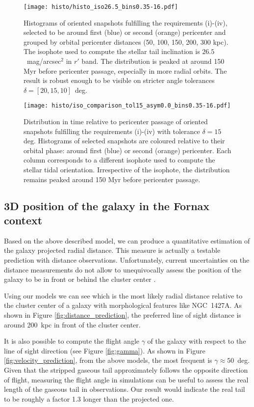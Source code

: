\begin{figure*}
\centering
\texttt{[image: histo/histo\_iso26.5\_bins0.35-16.pdf]}
\caption{Histograms of oriented snapshots fulfilling the requirements (i)-(iv), selected to be around first (blue) or second (orange) pericenter and grouped by orbital pericenter distances (50, 100, 150, 200, 300 kpc).
The isophote used to compute the stellar tail inclination is $26.5$~mag/arcsec$^2$ in $r'$ band.
The distribution is peaked at around 150 Myr before pericenter passage, especially in more radial orbits. The result is robust enough to be visible on stricter angle tolerances $\delta = [20, 15, 10]$~deg.
}
\label{fig:histo_peri}
\end{figure*}

\begin{figure*}
\centering
\texttt{[image: histo/iso\_comparison\_tol15\_asym0.0\_bins0.35-16.pdf]}
\caption{Distribution in time relative to pericenter passage of oriented snapshots fulfilling the requirements (i)-(iv) with tolerance $\delta=15$ deg.
Histograms of selected snapshots are coloured relative to their orbital phase: around first (blue) or second (orange) pericenter.
Each column corresponds to a different isophote used to compute the stellar tidal orientation.
Irrespective of the isophote, the distribution remains peaked  around 150 Myr before pericenter passage.}
\label{fig:histo_noperi}
\end{figure*}

\subsection{3D position of the galaxy in the Fornax context}

Based on the above described model, we can produce a quantitative estimation of the galaxy projected radial distance. This measure is actually a testable prediction with distance observations.
Unfortunately, current uncertainties on the distance measurements do not allow to unequivocally assess the position of the galaxy to be in front or behind the cluster center \citep{Georgiev2006}.

Using our models we can see which is the most likely radial distance relative to the cluster center of a galaxy with morphological features like NGC~1427A.
As shown in Figure \ref{fig:distance_prediction}, the preferred line of sight distance is around 200~kpc in front of the cluster center.

It is also possible to compute the flight angle $\gamma$ of the galaxy with respect to the line of sight direction (see Figure \ref{fig:gamma}).
As shown in Figure \ref{fig:velocity_prediction}, from the above models, the most frequent is $\gamma\approx 50$~deg.
Given that the stripped gaseous tail approximately follows the opposite direction of flight, measuring the flight angle in simulations can be useful to assess the real length of the gaseous tail in observations.
Our result would indicate the real tail to be roughly a factor 1.3 longer than the projected one.

